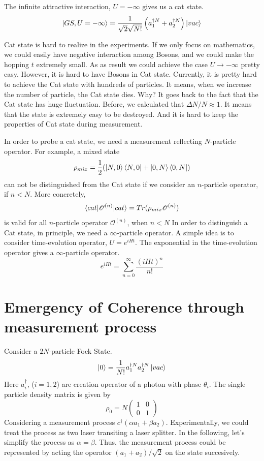 The infinite attractive interaction, $U = -\infty$ gives us a cat state.
\begin{equation}
\ket{GS, U=-\infty} = \frac{1}{\sqrt{2}\sqrt{N!}}\left(a_1^{\dag N}+a_2^{\dag N}\right)\ket{vac}
\end{equation}

Cat state is hard to realize in the experiments.
If we only focus on mathematics, we could easily have negative interaction among Bosons, and we could make the hopping $t$ extremely small. As as result we could achieve the case $U\rightarrow -\infty$ pretty easy. 
However, it is hard to have Bosons in Cat state. Currently, it is pretty hard to achieve the Cat state with hundreds of particles. It means, when we increase the number of particle, the Cat state dies. Why?
It goes back to the fact that the Cat state has huge fluctuation. Before, we calculated that $\Delta N /N \approx 1$. It means that the state is extremely
easy to be destroyed. And it is hard to keep the properties of Cat state during measurement.

In order to probe a cat state, we need a measurement reflecting $N$-particle operator. 
For example, a mixed state
\begin{equation}
\rho_{mix} = \frac{1}{2} (\ket{N,0}\bra{N,0} + \ket{0,N}\bra{0,N}) 
\end{equation}
can not be distinguished from the Cat state if we consider an $n$-particle operator, if $n<N$. More concretely, 
\begin{equation}
\braket{cat|\mathscr O^{(n)}|cat} = Tr (\rho_{mix} \mathscr O^{(n)})
\end{equation}
is valid for all $n$-particle operator $\mathscr O^{(n)}$, when $n<N$
In order to distinguish a Cat state, in principle, we need a $\infty$-particle operator. 
A simple idea is to consider time-evolution operator, $U = e^{i H t}$. The exponential in the time-evolution operator gives a $\infty$-particle operator.
\begin{equation}
e^{i H t} = \sum_{n=0}^\infty \frac{(iHt)^n}{n!}
\end{equation}
\section{Emergency of Coherence through measurement process}
Consider a $2N$-particle Fock State.
\begin{equation}
\ket{0} = \frac{1}{N!}a_1^{\dag N} a_2^{\dag N} \ket{vac}
\end{equation}
Here $a_i^\dag$, ($i= 1,2$) are creation operator of a photon with phase $\theta_i$.
The single particle density matrix is given by
\begin{equation}
\rho_{0} = N \left(\begin{array}{cc}
1 & 0\\
0 & 1
\end{array}\right)
\end{equation}
Considering a measurement process $c^\dag (\alpha a_1 + \beta a_2)$.
Experimentally, we could treat the process as two laser transiting a laser splitter.
In the following, let's simplify the process as $\alpha = \beta$.
Thus, the measurement process could be represented by acting the operator $(a_1+a_2)/\sqrt{2}$ on the state succesively.
